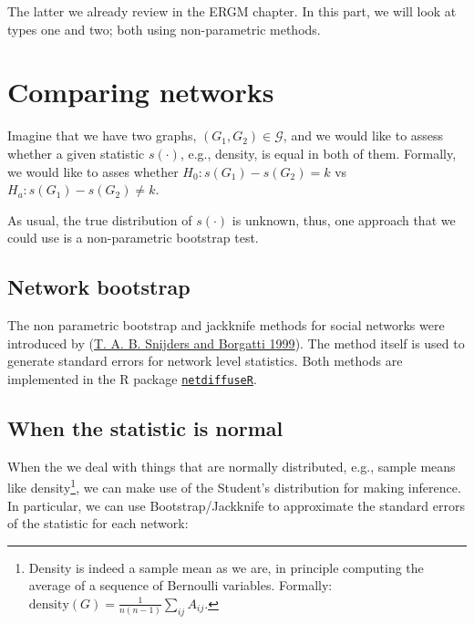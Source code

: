 \documentclass[
]{book}
\begin{document}
The latter we already review in the ERGM chapter. In this part, we will look
at types one and two; both using non-parametric methods.

\hypertarget{comparing-networks}{%
\section{Comparing networks}\label{comparing-networks}}

Imagine that we have two graphs, \((G_1,G_2) \in \mathcal{G}\), and we would like
to assess whether a given statistic \(s(\cdot)\), e.g., density, is equal in both of them.
Formally, we would like to asses whether \(H_0: s(G_1) - s(G_2) = k\) vs
\(H_a: s(G_1) - s(G_2) \neq k\).

As usual, the true distribution of \(s(\cdot)\) is unknown, thus, one approach that
we could use is a non-parametric bootstrap test.

\hypertarget{network-bootstrap}{%
\subsection{Network bootstrap}\label{network-bootstrap}}

The non parametric bootstrap and jackknife methods for social networks were
introduced by (\protect\hyperlink{ref-Snijders1999}{T. A. B. Snijders and Borgatti 1999}). The method itself is used to generate standard
errors for network level statistics. Both methods are implemented in the R
package \href{https://cran.r-project.org/package=netdiffuseR}{\texttt{netdiffuseR}}.

\hypertarget{when-the-statistic-is-normal}{%
\subsection{When the statistic is normal}\label{when-the-statistic-is-normal}}

When the we deal with things that are normally distributed, e.g., sample means
like density\footnote{Density is indeed a sample mean as we are, in principle
  computing the average of a sequence of Bernoulli variables. Formally:
  \(\mbox{density}(G) = \frac{1}{n(n-1)}\sum_{ij}A_{ij}\).},
we can make use of the Student's distribution for making inference. In particular,
we can use Bootstrap/Jackknife to approximate the standard errors of the statistic
for each network:
\end{document}
